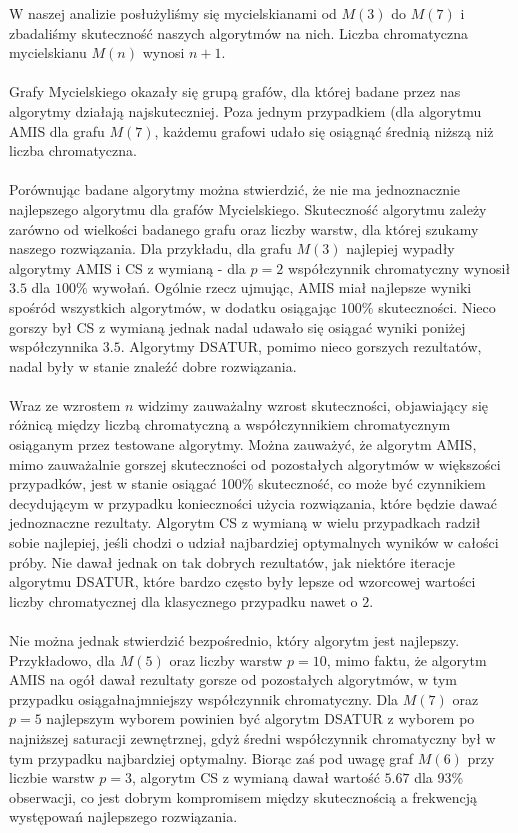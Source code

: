 \documentclass[10pt,a4paper]{article}
\begin{document}
	W naszej analizie posłużyliśmy się mycielskianami od $M(3)$ do $M(7)$ i zbadaliśmy skuteczność naszych algorytmów na nich. Liczba chromatyczna mycielskianu $M(n)$ wynosi $n + 1$. 
	\\~\\
	Grafy Mycielskiego okazały się grupą grafów, dla której badane przez nas algorytmy działają najskuteczniej. Poza jednym przypadkiem (dla algorytmu AMIS dla grafu $M(7)$, każdemu grafowi udało się osiągnąć średnią niższą niż liczba chromatyczna.
	\\~\\
	Porównując badane algorytmy można stwierdzić, że nie ma jednoznacznie najlepszego algorytmu dla grafów Mycielskiego. Skuteczność algorytmu zależy zarówno od wielkości badanego grafu oraz liczby warstw, dla której szukamy naszego rozwiązania. Dla przykładu, dla grafu $M(3)$ najlepiej wypadły algorytmy AMIS i CS z wymianą - dla $p = 2$ współczynnik chromatyczny wynosił $3.5$ dla $100\%$ wywołań. Ogólnie rzecz ujmując, AMIS miał najlepsze wyniki spośród wszystkich algorytmów, w dodatku osiągając $100\%$ skuteczności. Nieco gorszy był CS z wymianą jednak nadal udawało się osiągać wyniki poniżej współczynnika $3.5$. Algorytmy DSATUR, pomimo nieco gorszych rezultatów, nadal były w stanie znaleźć dobre rozwiązania.
	\\~\\
	Wraz ze wzrostem $n$ widzimy zauważalny wzrost skuteczności, objawiający się różnicą między liczbą chromatyczną a współczynnikiem chromatycznym osiąganym przez testowane algorytmy. Można zauważyć, że algorytm AMIS, mimo zauważalnie gorszej skuteczności od pozostałych algorytmów w większości przypadków, jest w stanie osiągać 100\% skuteczność, co może być czynnikiem decydującym w przypadku konieczności użycia rozwiązania, które będzie dawać jednoznaczne rezultaty. Algorytm CS z wymianą w wielu przypadkach radził sobie najlepiej, jeśli chodzi o udział najbardziej optymalnych wyników w całości próby. Nie dawał jednak on tak dobrych rezultatów, jak niektóre iteracje algorytmu DSATUR, które bardzo często były lepsze od wzorcowej wartości liczby chromatycznej dla klasycznego przypadku nawet o $2$.
	\\~\\
	Nie można jednak stwierdzić bezpośrednio, który algorytm jest najlepszy. Przykładowo, dla $M(5)$ oraz liczby warstw $p=10$, mimo faktu, że algorytm AMIS na ogół dawał rezultaty gorsze od pozostałych algorytmów, w tym przypadku osiągałnajmniejszy współczynnik chromatyczny. Dla $M(7)$ oraz $p=5$ najlepszym wyborem powinien być algorytm DSATUR z wyborem po najniższej saturacji zewnętrznej, gdyż średni współczynnik chromatyczny był w tym przypadku najbardziej optymalny. Biorąc zaś pod uwagę graf $M(6)$ przy liczbie warstw $p = 3$, algorytm CS z wymianą dawał wartość $5.67$ dla 93\% obserwacji, co jest dobrym kompromisem między skutecznością a frekwencją występowań najlepszego rozwiązania.
	
\end{document}
